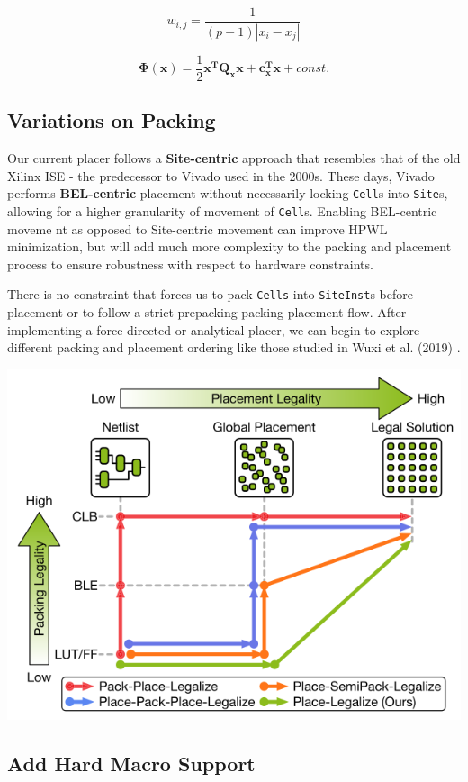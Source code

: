 \begin{equation}
    w_{i,j} = \frac{1}{(p-1) |x_i - x_j|}
    \label{equ:weight_linearized}
\end{equation}

\begin{equation}
    \boldsymbol{\Phi} (\boldsymbol{x}) = \frac{1}{2} \boldsymbol{x^T} \boldsymbol{Q_x} \boldsymbol{x} + \boldsymbol{c_x^T} \boldsymbol{x} + const.
    \label{equ:quadratic}
\end{equation}










\subsection{Variations on Packing}
Our current placer follows a \textbf{Site-centric} approach that resembles that of the old Xilinx ISE - the predecessor to Vivado used in the 2000s.
These days, Vivado performs \textbf{BEL-centric} placement without necessarily locking \texttt{Cell}s into \texttt{Site}s, allowing for a higher granularity of movement of \texttt{Cell}s. 
Enabling BEL-centric moveme
nt as opposed to Site-centric movement can improve HPWL minimization, but will add much more complexity to the packing and placement process to ensure robustness with respect to hardware constraints.

There is no constraint that forces us to pack \texttt{Cells} into \texttt{SiteInst}s before placement or to follow a strict prepacking-packing-placement flow. 
After implementing a force-directed or analytical placer, we can begin to explore different packing and placement ordering like those studied in Wuxi et al. (2019) \cite{ExplicitPacking}.

{
    \centering
    \includegraphics[width=\columnwidth]{figures/future_work/legalization.png}
}
\vspace{0.25cm}

\subsection{Add Hard Macro Support}






